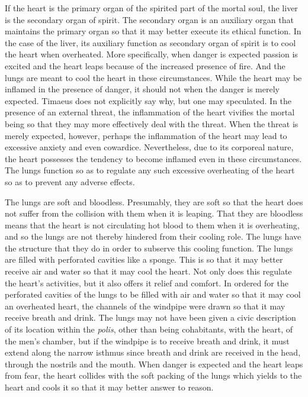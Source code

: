 If the heart is the primary organ of the spirited part of the mortal soul, the liver is the secondary organ of spirit. The secondary organ is an auxiliary organ that maintains the primary organ so that it may better execute its ethical function. In the case of the liver, its auxiliary function as secondary organ of spirit is to cool the heart when overheated. More specifically, when danger is expected passion is excited and the heart leaps because of the increased presence of fire. And the lungs are meant to cool the heart in these circumstances. While the heart may be inflamed in the presence of danger, it should not when the danger is merely expected. Timaeus does not explicitly say why, but one may speculated. In the presence of an external threat, the inflammation of the heart vivifies the mortal being so that they may more effectively deal with the threat. When the threat is merely expected, however, perhaps the inflammation of the heart may lead to excessive anxiety and even cowardice. Nevertheless, due to its corporeal nature, the heart possesses the tendency to become inflamed even in these circumstances. The lungs function so as to regulate any such excessive overheating of the heart so as to prevent any adverse effects.

The lungs are soft and bloodless. Presumably, they are soft so that the heart does not suffer from the collision with them when it is leaping. That they are bloodless means that the heart is not circulating hot blood to them when it is overheating, and so the lungs are not thereby hindered from their cooling role. The lungs have the structure that they do in order to subserve this cooling function. The lungs are filled with perforated cavities like a sponge. This is so that it may better receive air and water so that it may cool the heart. Not only does this regulate the heart's activities, but it also offers it relief and comfort. In ordered for the perforated cavities of the lungs to be filled with air and water so that it may cool an overheated heart, the channels of the windpipe were drawn so that it may receive breath and drink. The lungs may not have been given a civic description of its location within the \emph{polis}, other than being cohabitants, with the heart, of the men's chamber, but if the windpipe is to receive breath and drink, it must extend along the narrow isthmus since breath and drink are received in the head, through the nostrils and the mouth. When danger is expected and the heart leaps from fear, the heart collides with the soft packing of the lungs which yields to the heart and cools it so that it may better answer to reason.

